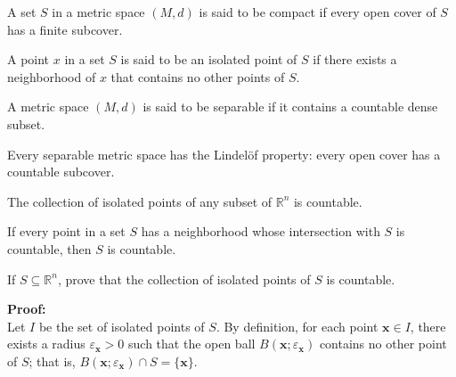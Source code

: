 \begin{definition}
A set $S$ in a metric space $(M,d)$ is said to be compact if every open cover of $S$ has a finite subcover.
\end{definition}

\begin{definition}
A point $x$ in a set $S$ is said to be an isolated point of $S$ if there exists a neighborhood of $x$ that contains no other points of $S$.
\end{definition}

\begin{definition}
A metric space $(M,d)$ is said to be separable if it contains a countable dense subset.
\end{definition}

\begin{theorem}
Every separable metric space has the Lindelöf property: every open cover has a countable subcover.
\end{theorem}

\begin{theorem}
The collection of isolated points of any subset of $\mathbb{R}^n$ is countable.
\end{theorem}

\begin{theorem}
If every point in a set $S$ has a neighborhood whose intersection with $S$ is countable, then $S$ is countable.
\end{theorem}

\begin{problembox}
If \( S \subseteq \mathbb{R}^n \), prove that the collection of isolated points of \( S \) is countable.
\end{problembox}

\textbf{Proof:}\\
Let $I$ be the set of isolated points of $S$. By definition, for each point $\mathbf{x} \in I$, there exists a radius $\varepsilon_{\mathbf{x}} > 0$ such that the open ball $B(\mathbf{x}; \varepsilon_{\mathbf{x}})$ contains no other point of $S$; that is, $B(\mathbf{x}; \varepsilon_{\mathbf{x}}) \cap S = \{\mathbf{x}\}$.

